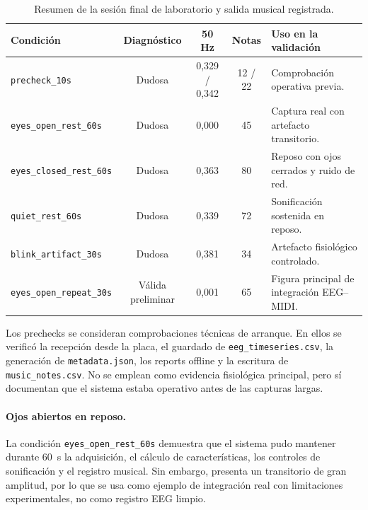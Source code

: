 \begin{table}[htbp]
    \centering
    \small
    \caption{Resumen de la sesión final de laboratorio y salida musical registrada.}
    \label{tab:validacion_sesion_final_musica}
    \begin{tabular}{p{} c c c p{}}
        \hline
        \textbf{Condición} & \textbf{Diagnóstico} & \textbf{50 Hz} & \textbf{Notas} & \textbf{Uso en la validación} \\
        \hline
        \texttt{precheck\_10s} & Dudosa & 0,329 / 0,342 & 12 / 22 & Comprobación operativa previa. \\
        \texttt{eyes\_open\_rest\_60s} & Dudosa & 0,000 & 45 & Captura real con artefacto transitorio. \\
        \texttt{eyes\_closed\_rest\_60s} & Dudosa & 0,363 & 80 & Reposo con ojos cerrados y ruido de red. \\
        \texttt{quiet\_rest\_60s} & Dudosa & 0,339 & 72 & Sonificación sostenida en reposo. \\
        \texttt{blink\_artifact\_30s} & Dudosa & 0,381 & 34 & Artefacto fisiológico controlado. \\
        \texttt{eyes\_open\_repeat\_30s} & Válida preliminar & 0,001 & 65 & Figura principal de integración EEG--MIDI. \\
        \hline
    \end{tabular}
\end{table}

Los prechecks se consideran comprobaciones técnicas de arranque. En ellos se verificó la recepción desde la placa, el guardado de \texttt{eeg\_timeseries.csv}, la generación de \texttt{metadata.json}, los reports offline y la escritura de \texttt{music\_notes.csv}. No se emplean como evidencia fisiológica principal, pero sí documentan que el sistema estaba operativo antes de las capturas largas.

\paragraph{Ojos abiertos en reposo.}
La condición \texttt{eyes\_open\_rest\_60s} demuestra que el sistema pudo mantener durante \SI{60}{\second} la adquisición, el cálculo de características, los controles de sonificación y el registro musical. Sin embargo, presenta un transitorio de gran amplitud, por lo que se usa como ejemplo de integración real con limitaciones experimentales, no como registro EEG limpio.

